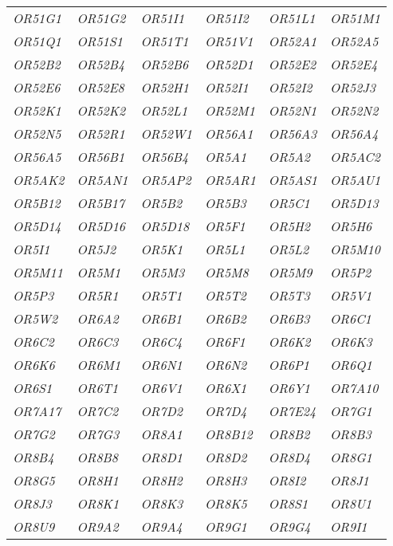 {\begin{longtable}{>{\em}l>{\em}l>{\em}l>{\em}l>{\em}l>{\em}l}
  \rowcolor{black!5} 
  OR51G1 & OR51G2 & OR51I1 & OR51I2 & OR51L1 & OR51M1 \\ 
  \rowcolor{black!10} 
  OR51Q1 & OR51S1 & OR51T1 & OR51V1 & OR52A1 & OR52A5 \\ 
  \rowcolor{black!5} 
  OR52B2 & OR52B4 & OR52B6 & OR52D1 & OR52E2 & OR52E4 \\ 
  \rowcolor{black!10} 
  OR52E6 & OR52E8 & OR52H1 & OR52I1 & OR52I2 & OR52J3 \\ 
  \rowcolor{black!5} 
  OR52K1 & OR52K2 & OR52L1 & OR52M1 & OR52N1 & OR52N2 \\ 
  \rowcolor{black!10} 
  OR52N5 & OR52R1 & OR52W1 & OR56A1 & OR56A3 & OR56A4 \\ 
  \rowcolor{black!5} 
  OR56A5 & OR56B1 & OR56B4 & OR5A1 & OR5A2 & OR5AC2 \\ 
  \rowcolor{black!10} 
  OR5AK2 & OR5AN1 & OR5AP2 & OR5AR1 & OR5AS1 & OR5AU1 \\ 
  \rowcolor{black!5} 
  OR5B12 & OR5B17 & OR5B2 & OR5B3 & OR5C1 & OR5D13 \\ 
  \rowcolor{black!10} 
  OR5D14 & OR5D16 & OR5D18 & OR5F1 & OR5H2 & OR5H6 \\ 
  \rowcolor{black!5} 
  OR5I1 & OR5J2 & OR5K1 & OR5L1 & OR5L2 & OR5M10 \\ 
  \rowcolor{black!10} 
  OR5M11 & OR5M1 & OR5M3 & OR5M8 & OR5M9 & OR5P2 \\ 
  \rowcolor{black!5} 
  OR5P3 & OR5R1 & OR5T1 & OR5T2 & OR5T3 & OR5V1 \\ 
  \rowcolor{black!10} 
  OR5W2 & OR6A2 & OR6B1 & OR6B2 & OR6B3 & OR6C1 \\ 
  \rowcolor{black!5} 
  OR6C2 & OR6C3 & OR6C4 & OR6F1 & OR6K2 & OR6K3 \\ 
  \rowcolor{black!10} 
  OR6K6 & OR6M1 & OR6N1 & OR6N2 & OR6P1 & OR6Q1 \\ 
  \rowcolor{black!5} 
  OR6S1 & OR6T1 & OR6V1 & OR6X1 & OR6Y1 & OR7A10 \\ 
  \rowcolor{black!10} 
  OR7A17 & OR7C2 & OR7D2 & OR7D4 & OR7E24 & OR7G1 \\ 
  \rowcolor{black!5} 
  OR7G2 & OR7G3 & OR8A1 & OR8B12 & OR8B2 & OR8B3 \\ 
  \rowcolor{black!10} 
  OR8B4 & OR8B8 & OR8D1 & OR8D2 & OR8D4 & OR8G1 \\ 
  \rowcolor{black!5} 
  OR8G5 & OR8H1 & OR8H2 & OR8H3 & OR8I2 & OR8J1 \\ 
  \rowcolor{black!10} 
  OR8J3 & OR8K1 & OR8K3 & OR8K5 & OR8S1 & OR8U1 \\ 
  \rowcolor{black!5} 
  OR8U9 & OR9A2 & OR9A4 & OR9G1 & OR9G4 & OR9I1 \\ 

\end{longtable}}
